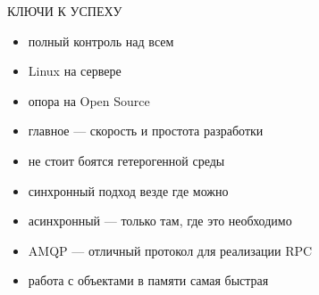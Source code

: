 \documentclass[aspectratio=169]{beamer}
\begin{document}
{
\begin{frame}[plain]{}
\end{frame}
}

\begin{frame}{КЛЮЧИ К УСПЕХУ}
    \begin{itemize}
        \item полный контроль над всем
        \item Linux на сервере
        \item опора на Open Source
        \item главное --- скорость и простота разработки
        \item не стоит боятся гетерогенной среды
        \item синхронный подход везде где можно
        \item асинхронный --- только там, где это необходимо
        \item AMQP --- отличный протокол для реализации RPC
        \item работа с объектами в памяти самая быстрая
    \end{itemize}
\end{frame}
\end{document}
